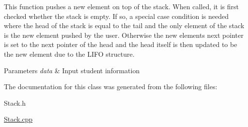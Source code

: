 This function pushes a new element on top of the stack. When called, it is first checked whether the stack is empty. If so, a special case condition is needed where the head of the stack is equal to the tail and the only element of the stack is the new element pushed by the user. Otherwise the new element\textquotesingle{}s next pointer is set to the next pointer of the head and the head itself is then updated to be the new element due to the L\+I\+FO structure.


\begin{DoxyParams}{Parameters}
{\em data} & Input student information \\
\hline
\end{DoxyParams}


The documentation for this class was generated from the following files\+:\begin{DoxyCompactItemize}
\item 
Stack.\+h\item 
\hyperlink{_stack_8cpp}{Stack.\+cpp}\end{DoxyCompactItemize}
